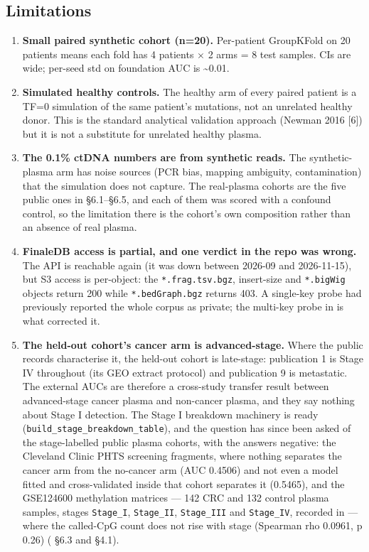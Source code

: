 \documentclass[11pt]{article}
\begin{document}
\subsection{Limitations}
\begin{enumerate}
\item
\textbf{Small paired synthetic cohort (n=\allowbreak{}20).} Per-patient GroupKFold on 20 patients means each fold has 4 patients $\times$ 2 arms =\allowbreak{} 8 test samples. CIs are wide; per-seed std on foundation AUC is \textasciitilde{}0.01.
\item
\textbf{Simulated healthy controls.} The healthy arm of every paired patient is a TF=\allowbreak{}0 simulation of the same patient's mutations, not an unrelated healthy donor. This is the standard analytical validation approach (Newman 2016 [6]) but it is not a substitute for unrelated healthy plasma.
\item
\textbf{The 0.1\% ctDNA numbers are from synthetic reads.} The synthetic-plasma arm has noise sources (PCR bias, mapping ambiguity, contamination) that the simulation does not capture. The real-plasma cohorts are the five public ones in  \S{}6.1--\S{}6.5, and each of them was scored with a confound control, so the limitation there is the cohort's own composition rather than an absence of real plasma.
\item
\textbf{FinaleDB access is partial, and one verdict in the repo was wrong.} The API is reachable again (it was down between 2026-09 and 2026-11-15), but S3 access is per-object: the \texttt{*.frag.tsv.bgz}, insert-size and \texttt{*.bigWig} objects return 200 while \texttt{*.bedGraph.bgz} returns 403. A single-key probe had previously reported the whole corpus as private; the multi-key probe in  is what corrected it.
\item
\textbf{The held-out cohort's cancer arm is advanced-stage.} Where the public records characterise it, the held-out cohort is late-stage: publication 1 is Stage IV throughout (its GEO extract protocol) and publication 9 is metastatic. The external AUCs are therefore a cross-study transfer result between advanced-stage cancer plasma and non-cancer plasma, and they say nothing about Stage I detection. The Stage I breakdown machinery is ready (\texttt{build\_\allowbreak{}stage\_\allowbreak{}breakdown\_\allowbreak{}table}), and the question has since been asked of the stage-labelled public plasma cohorts, with the answers negative: the Cleveland Clinic PHTS screening fragments, where nothing separates the cancer arm from the no-cancer arm (AUC 0.4506) and not even a model fitted and cross-validated inside that cohort separates it (0.5465), and the GSE124600 methylation matrices --- 142 CRC and 132 control plasma samples, stages \texttt{Stage\_\allowbreak{}I}, \texttt{Stage\_\allowbreak{}II}, \texttt{Stage\_\allowbreak{}III} and \texttt{Stage\_\allowbreak{}IV}, recorded in  --- where the called-CpG count does not rise with stage (Spearman rho 0.0961, p 0.26) ( \S{}6.3 and \S{}4.1).

\end{enumerate}
\end{document}
